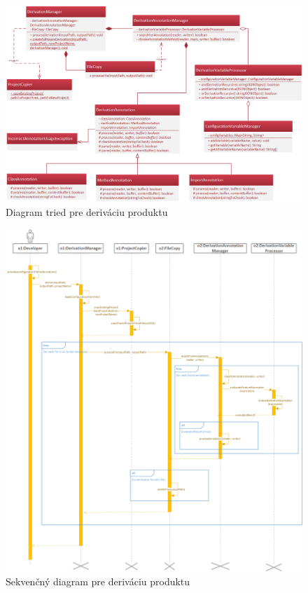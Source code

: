 \documentclass[11pt,slovak,a4paper,twoside]{article}
\begin{document}
\begin{figure}[H]  %
					\begin{center}
									\includegraphics[width=\linewidth]{fig/DerivationClass.png}
									\caption{Diagram tried pre deriváciu produktu}
									\label{derivationProductClassDiagram}
					\end{center}
\end{figure}

\begin{figure}[H]  %
					\begin{center}
									\includegraphics[width=\linewidth]{fig/derivationProcess.png}
									\caption{Sekvenčný diagram pre deriváciu produktu}
									\label{derivationProductSequenceDiagram}
					\end{center}
\end{figure}
\end{document}
